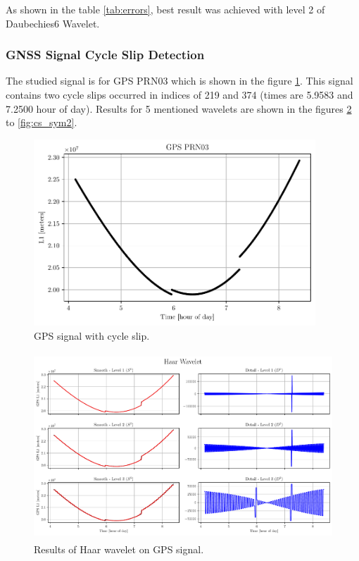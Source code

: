 \documentclass[12pt]{article}
\begin{document}
	As shown in the table \ref{tab:errors}, best result was achieved with level 2 of Daubechies6 Wavelet.
	
	\subsubsection{GNSS Signal Cycle Slip Detection}
	
	The studied signal is for GPS PRN03 which is shown in the figure \ref{fig:GPS_Signal}. This signal contains two cycle slips occurred in indices of 219 and 374 (times are 5.9583 and 7.2500 hour of day). Results for 5 mentioned wavelets are shown in the figures \ref{fig:cs_haar} to \ref{fig:cs_sym2}. 
	
	\begin{figure}[!h]
		\centering
		\includegraphics[height=7cm]{../Tests/Outputs/CycleSlip_MainSignal.pdf}
		\caption{GPS signal with cycle slip.}
		\label{fig:GPS_Signal}
	\end{figure}
	
	\begin{figure}[!h]
		\centering
		\includegraphics[height=7cm]{../Tests/Outputs/CycleSlip_Haar.pdf}
		\caption{Results of Haar wavelet on GPS signal.}
		\label{fig:cs_haar}
	\end{figure}
	
\end{document}

